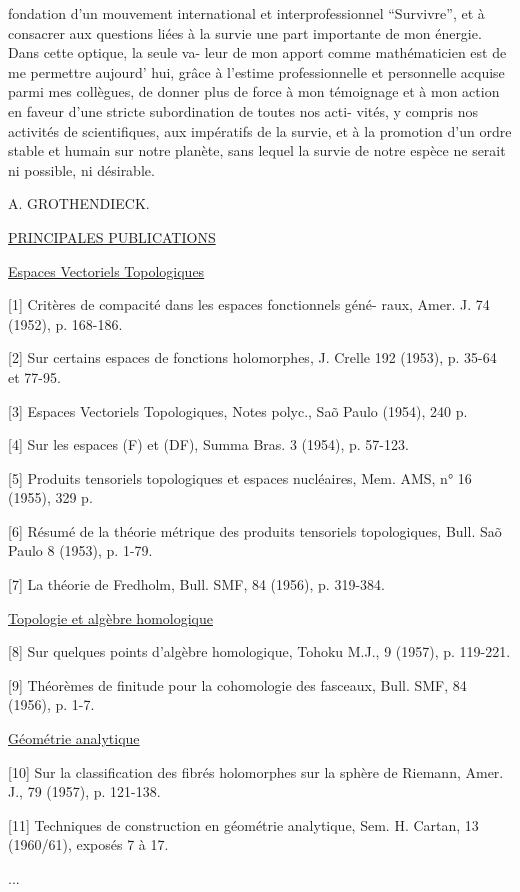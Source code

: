 
fondation d'un mouvement international et interprofessionnel
``Survivre'', et à consacrer aux questions liées à la survie une
part importante de mon énergie. Dans cette optique, la seule va-%
leur de mon apport comme mathématicien est de me permettre aujourd'
hui, grâce à l'estime professionnelle et personnelle acquise parmi
mes collègues, de donner plus de force à mon témoignage et à mon
action en faveur d'une stricte subordination de toutes nos acti-%
vités, y compris nos activités de scientifiques, aux impératifs
de la survie, et à la promotion d'un ordre stable et humain sur
notre planète, sans lequel la survie de notre espèce ne serait
ni possible, ni désirable.

A. GROTHENDIECK.

\uline{PRINCIPALES PUBLICATIONS}

\uline{Espaces Vectoriels Topologiques}

[1] Critères de compacité dans les espaces fonctionnels géné-%
raux, Amer. J. 74 (1952), p. 168-186.

[2] Sur certains espaces de fonctions holomorphes, J. Crelle
192 (1953), p. 35-64 et 77-95.

[3] Espaces Vectoriels Topologiques, Notes polyc., Saõ Paulo
(1954), 240 p.

[4] Sur les espaces (F) et (DF), Summa Bras. 3 (1954),
p. 57-123.

[5] Produits tensoriels topologiques et espaces nucléaires,
Mem. AMS, n° 16 (1955), 329 p.

[6] Résumé de la théorie métrique des produits tensoriels
topologiques, Bull. Saõ Paulo 8 (1953), p. 1-79.

[7] La théorie de Fredholm, Bull. SMF, 84 (1956), p. 319-384.

\uline{Topologie et algèbre homologique}

[8] Sur quelques points d'algèbre homologique, Tohoku M.J.,
9 (1957), p. 119-221.

[9] Théorèmes de finitude pour la cohomologie des fasceaux,
Bull. SMF, 84 (1956), p. 1-7.

\uline{Géométrie analytique}

[10] Sur la classification des fibrés holomorphes sur la
sphère de Riemann, Amer. J., 79 (1957), p. 121-138.

[11] Techniques de construction en géométrie analytique,
Sem. H. Cartan, 13 (1960/61), exposés 7 à 17.

...

